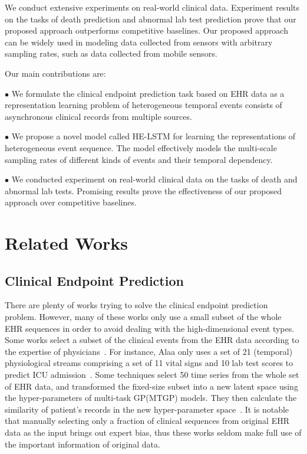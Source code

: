 \documentclass[letterpaper]{article} %
\begin{document}
We conduct extensive experiments on real-world clinical data. Experiment results on the tasks of death prediction and abnormal lab test prediction prove that our proposed approach outperforms competitive baselines. Our proposed approach can be widely used in modeling data collected from sensors with arbitrary sampling rates, such as data collected from mobile sensors.

Our main contributions are:

$\bullet$ We formulate the clinical endpoint prediction task based on EHR data as a representation learning problem of heterogeneous temporal events consists of  asynchronous clinical records from multiple sources.

$\bullet$  We propose a novel model called HE-LSTM for learning the representations of heterogeneous event sequence. The model effectively models the multi-scale sampling rates of different kinds of events and their temporal dependency.


$\bullet$ We conducted experiment on real-world clinical data on the tasks of death and abnormal lab tests. Promising results prove the effectiveness of our proposed approach over competitive baselines.



\section{Related Works}
\subsection{Clinical Endpoint Prediction}
There are plenty of works trying to solve the clinical endpoint prediction problem. However, many of these works only use a small subset of the whole EHR sequences in order to avoid dealing with the high-dimensional event types. Some works select a subset of the clinical events from the EHR data according to the expertise of physicians~\cite{caballero2015dynamically}. For instance,  Alaa
only uses a set of 21 (temporal) physiological streams comprising a set of 11 vital signs and 10 lab test scores to predict ICU admission~\cite{alaa2017learning}.  Some techniques select 50 time series from the whole set of EHR data, and transformed the fixed-size subset into a new latent space using the hyper-parameters of multi-task GP(MTGP) models. They then calculate the similarity of patient's records in the new hyper-parameter space~\cite{ghassemi2015multivariate}. It is notable that manually selecting only a fraction of clinical sequences from original EHR data as the input brings out expert bias, thus these works seldom make full use of the important information of original data.
\end{document}
